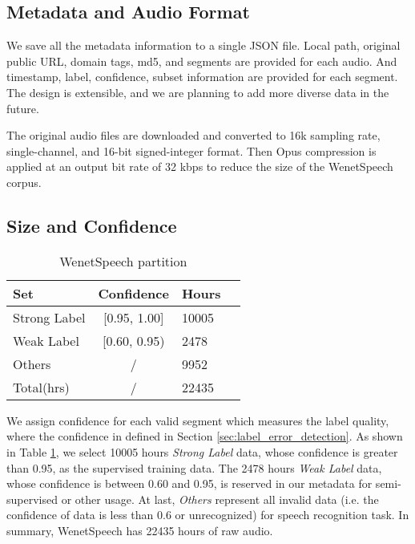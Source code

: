 \documentclass{article}
\begin{document}
\vspace{-1.2em}
\subsection{Metadata and Audio Format}
\vspace{-0.5em}

We save all the metadata information to a single JSON file. Local path, original public URL, domain tags, md5, and segments are provided for each audio. And timestamp, label, confidence, subset information are provided for each segment. The design is extensible, and we are planning to add more diverse data in the future.

The original audio files are downloaded and converted to 16k sampling rate, single-channel, and 16-bit signed-integer format. Then Opus compression is applied at an output bit rate of 32 kbps to reduce the size of the WenetSpeech corpus.

\vspace{-1.2em}
\subsection{Size and Confidence}
\vspace{-0.5em}

\begin{table}[t]
\caption{WenetSpeech partition}
\label{tab:confidence}
\centering
\begin{tabular}{@{}lcll@{}}
\toprule[2pt]
Set          & Confidence    & Hours    \\
\midrule[1pt]
Strong Label & [0.95, 1.00]  & 10005    \\
Weak Label   & [0.60, 0.95)  & 2478     \\
Others       & /             & 9952     \\
\midrule[1pt]
Total(hrs)       & /             & 22435 \\ \bottomrule[2pt]
\end{tabular}
\vspace{-1.5em}
\end{table}

We assign confidence for each valid segment which measures the label quality, where the confidence in defined in Section \ref{sec:label_error_detection}.
As shown in Table \ref{tab:confidence}, we select 10005 hours \textit{Strong Label} data, whose confidence is greater than 0.95, as the supervised training data. The 2478 hours \textit{Weak Label} data, whose confidence is between 0.60 and 0.95, is reserved in our metadata for semi-supervised or other usage. At last, \textit{Others} represent all invalid data (i.e. the confidence of data is less than 0.6 or unrecognized) for speech recognition task. In summary, WenetSpeech has 22435 hours of raw audio.
\end{document}

